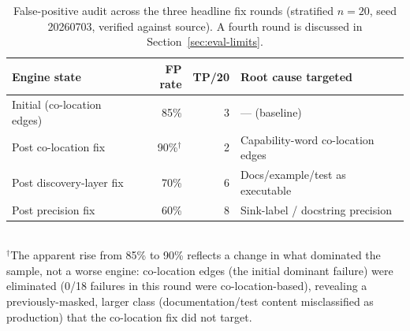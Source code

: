 \begin{table}[t]\centering\caption{False-positive audit across the three headline fix rounds (stratified $n{=}20$, seed 20260703, verified against source). A fourth round is discussed in Section~\ref{sec:eval-limits}.}\label{tab:audit}
\begin{tabular}{lrrl}\toprule
Engine state & FP rate & TP/20 & Root cause targeted \\\midrule
Initial (co-location edges) & 85\% & 3 & --- (baseline) \\
Post co-location fix & 90\%$^{\dagger}$ & 2 & Capability-word co-location edges \\
Post discovery-layer fix & 70\% & 6 & Docs/example/test as executable \\
Post precision fix & 60\% & 8 & Sink-label / docstring precision \\
\bottomrule\end{tabular}
\\[2pt]\footnotesize $^{\dagger}$The apparent rise from 85\% to 90\% reflects a change in what dominated the sample, not a worse engine: co-location edges (the initial dominant failure) were eliminated (0/18 failures in this round were co-location-based), revealing a previously-masked, larger class (documentation/test content misclassified as production) that the co-location fix did not target.
\end{table}
